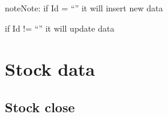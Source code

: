 \documentclass[letterpaper,10pt,english,openany,oneside]{sphinxmanual}
\begin{document}
\begin{fulllineitems}
\begin{sphinxVerbatim}[commandchars=\\\{\}]
             
             
             
             
             
             
    \PYG{p}{]}
\end{sphinxVerbatim}

\end{fulllineitems}


\begin{sphinxadmonition}{note}{Note:}
\sphinxAtStartPar
if Id = “” it will insert new data

\sphinxAtStartPar
if Id != “” it will update data
\end{sphinxadmonition}


\section{Stock data}
\label{\detokenize{api/v4:stock-data}}

\subsection{Stock close}
\label{\detokenize{api/v4:stock-close}}
\end{document}
